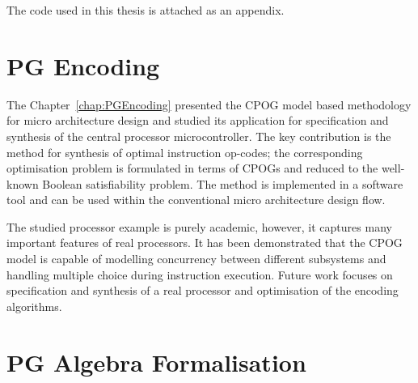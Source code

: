 The code used in this thesis is attached as an appendix.

\section{PG Encoding}

The Chapter~\ref{chap:PGEncoding} presented the CPOG model based methodology for micro architecture
design and studied its application for specification and synthesis
of the central processor microcontroller. The key contribution is
the method for synthesis of optimal instruction op-codes; the corresponding
optimisation problem is formulated in terms of CPOGs and reduced to
the well-known Boolean satisfiability problem. The method is implemented
in a software tool and can be used within the conventional micro architecture
design flow.

The studied processor example is purely academic, however, it captures
many important features of real processors. It has been demonstrated
that the CPOG model is capable of modelling concurrency between different
subsystems and handling multiple choice during instruction execution.
Future work focuses on specification and synthesis of a real processor
and optimisation of the encoding algorithms.


\section{PG Algebra Formalisation}
